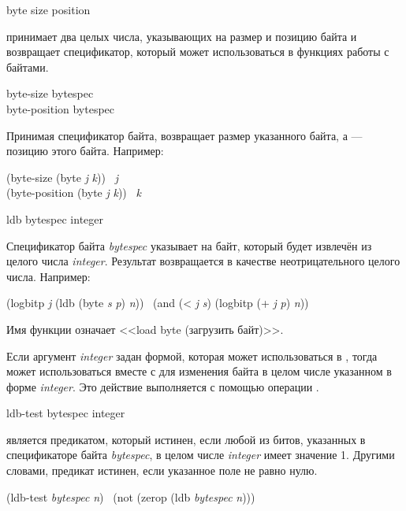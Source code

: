 \begin{defun}[Функция]
byte size position

 принимает два целых числа, указывающих на размер и позицию байта и
возвращает спецификатор, который может использоваться в функциях работы с
байтами.
\end{defun}

\begin{defun}[Функция]
byte-size bytespec \\
byte-position bytespec

Принимая спецификатор байта,  возвращает размер указанного
байта, а  --- позицию этого байта.
Например:
\begin{lisp}
(byte-size (byte \emph{j} \emph{k})) \EQ\ \emph{j} \\
(byte-position (byte \emph{j} \emph{k})) \EQ\ \emph{k}
\end{lisp}
\end{defun}

\begin{defun}[Функция]
ldb bytespec integer

Спецификатор байта \emph{bytespec} указывает на байт, который будет извлечён из
целого числа \emph{integer}.
Результат возвращается в качестве неотрицательного целого числа.
Например:
\begin{lisp}
(logbitp \emph{j} (ldb (byte \emph{s} \emph{p}) \emph{n})) \EQ\ (and (< \emph{j} \emph{s}) (logbitp (+ \emph{j} \emph{p}) \emph{n}))
\end{lisp}
Имя функции  означает <<load byte (загрузить байт)>>.

Если аргумент \emph{integer} задан формой, которая может использоваться в
, тогда  может использоваться вместе с  для
изменения байта в целом числе указанном в форме \emph{integer}.
Это действие выполняется с помощью операции .
\end{defun}

\begin{defun}[Функция]
ldb-test bytespec integer

 является предикатом, который истинен, если любой из битов,
указанных в спецификаторе байта \emph{bytespec}, в целом числе \emph{integer}
имеет значение 1.
Другими словами, предикат истинен, если указанное поле не равно нулю.
\begin{lisp}
(ldb-test \emph{bytespec} \emph{n}) \EQ\ (not (zerop (ldb \emph{bytespec} \emph{n})))
\end{lisp}
\end{defun}

